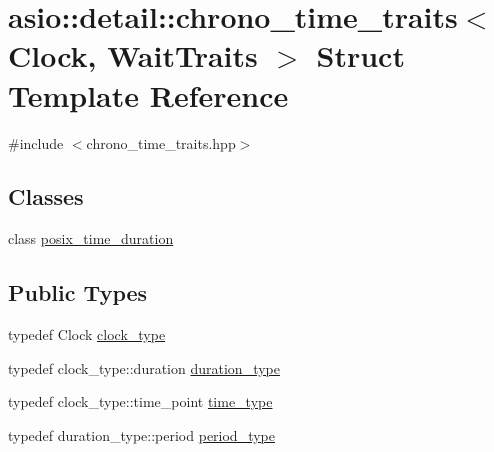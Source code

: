 \hypertarget{structasio_1_1detail_1_1chrono__time__traits}{}\section{asio\+:\+:detail\+:\+:chrono\+\_\+time\+\_\+traits$<$ Clock, Wait\+Traits $>$ Struct Template Reference}
\label{structasio_1_1detail_1_1chrono__time__traits}


{\ttfamily \#include $<$chrono\+\_\+time\+\_\+traits.\+hpp$>$}

\subsection*{Classes}
\begin{DoxyCompactItemize}
\item 
class \hyperlink{classasio_1_1detail_1_1chrono__time__traits_1_1posix__time__duration}{posix\+\_\+time\+\_\+duration}
\end{DoxyCompactItemize}
\subsection*{Public Types}
\begin{DoxyCompactItemize}
\item 
typedef Clock \hyperlink{structasio_1_1detail_1_1chrono__time__traits_a0043b268ffdb59f6b880a96512ab5453}{clock\+\_\+type}
\item 
typedef clock\+\_\+type\+::duration \hyperlink{structasio_1_1detail_1_1chrono__time__traits_a7f122a7cb603e7516bb6595016960775}{duration\+\_\+type}
\item 
typedef clock\+\_\+type\+::time\+\_\+point \hyperlink{structasio_1_1detail_1_1chrono__time__traits_a19c14f4d45a8b164d2ea4590eebc1c10}{time\+\_\+type}
\item 
typedef duration\+\_\+type\+::period \hyperlink{structasio_1_1detail_1_1chrono__time__traits_aebb85fcb3beb946b4ea037a411b6d931}{period\+\_\+type}
\end{DoxyCompactItemize}
